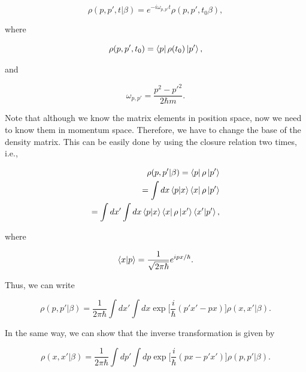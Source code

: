 \documentclass{article}
\begin{document}
\begin{equation}\label{time_evo_energy_eigenkets}
    \rho(p,p',t|\beta) = e^{-i\omega_{p,p'}t} \rho(p,p',t_{0}\beta),
\end{equation}

where

\begin{equation}
    \rho(p,p',t_{0}) = \bra{p} \rho(t_{0}) \ket{p'},
\end{equation}

and

\begin{equation}\label{freq_omega_no_gravity}
    \omega_{p,p'} = \frac{p^{2}-p'^{2}}{2\hbar m}.
\end{equation}

Note that although we know the matrix elements in position space, now we need to know them in momentum space. Therefore, we have to change the base of the density matrix. This can be easily done by using the closure relation two times, i.e.,

\begin{equation}
    \begin{split}
        \rho(p,p'|\beta) = \bra{p} \rho \ket{p'} \\ = \int dx \braket{p|x} \bra{x} \rho \ket{p'} \\ =\int dx' \int dx \braket{p|x} \bra{x} \rho \ket{x'} \braket{x'|p'},
    \end{split}
\end{equation}

where

\begin{equation}
    \braket{x|p} = \frac{1}{\sqrt{2\pi \hbar}} e^{i px/\hbar}.
\end{equation}

Thus, we can write

\begin{equation}\label{density_mat_from_x_to_p}
    \rho(p,p'|\beta) = \frac{1}{2\pi \hbar} \int dx' \int dx \exp \bigg[ \frac{i}{\hbar} (p'x'-px) \bigg] \rho(x,x'|\beta).
\end{equation}

In the same way, we can show that the inverse transformation is given by

\begin{equation}\label{density_mat_from_p_to_x}
    \rho(x,x'|\beta) = \frac{1}{2\pi \hbar} \int dp' \int dp \exp \bigg[ \frac{i}{\hbar} (px-p'x') \bigg] \rho(p,p'|\beta).
\end{equation}
\end{document}
